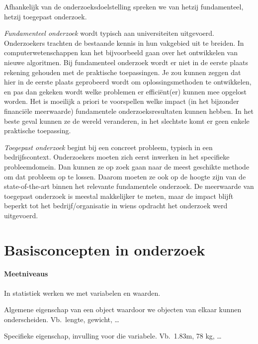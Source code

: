 Afhankelijk van de onderzoeksdoelstelling spreken we van hetzij fundamenteel, hetzij toegepast onderzoek.

\emph{Fundamenteel onderzoek} wordt typisch aan universiteiten uitgevoerd. Onderzoekers trachten de bestaande kennis in hun vakgebied uit te breiden. In computerwetenschappen kan het bijvoorbeeld gaan over het ontwikkelen van nieuwe algoritmen. Bij fundamenteel onderzoek wordt er niet in de eerste plaats rekening gehouden met de praktische toepassingen. Je zou kunnen zeggen dat hier in de eerste plaats geprobeerd wordt om oplossingsmethoden te ontwikkelen, en pas dan gekeken wordt welke problemen er efficiënt(er) kunnen mee opgelost worden. Het is moeilijk a priori te voorspellen welke impact (in het bijzonder financiële meerwaarde) fundamentele onderzoeksresultaten kunnen hebben. In het beste geval kunnen ze de wereld veranderen, in het slechtste komt er geen enkele praktische toepassing.

\emph{Toegepast onderzoek} begint bij een concreet probleem, typisch in een bedrijfscontext. Onderzoekers moeten zich eerst inwerken in het specifieke probleemdomein. Dan kunnen ze op zoek gaan naar de meest geschikte methode om dat probleem op te lossen. Daarom moeten ze ook op de hoogte zijn van de state-of-the-art binnen het relevante fundamentele onderzoek. De meerwaarde van toegepast onderzoek is meestal makkelijker te meten, maar de impact blijft beperkt tot het bedrijf/organisatie in wiens opdracht het onderzoek werd uitgevoerd.

\section{Basisconcepten in onderzoek}

\paragraph{Meetniveaus}

In statistiek werken we met variabelen en waarden.

\begin{definition}[Variabele] 
  Algemene eigenschap van een object waardoor we objecten van elkaar kunnen onderscheiden. Vb.~lengte, gewicht, \ldots
\end{definition}  
\begin{definition}[Waarde]
  Specifieke eigenschap, invulling voor die variabele. Vb.~1.83m, 78 kg, \ldots
\end{definition}

